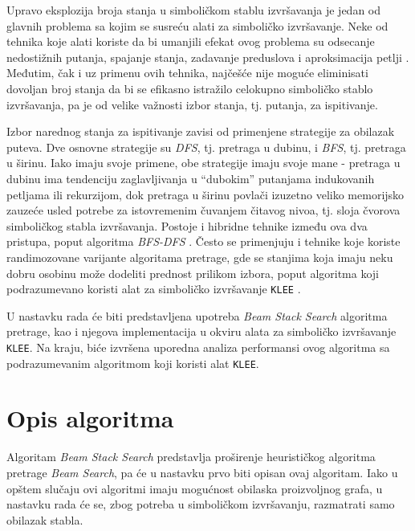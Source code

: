 \documentclass[a4paper]{article}
\begin{document}
Upravo eksplozija broja stanja u simboličkom stablu izvršavanja je jedan od glavnih problema sa kojim se susreću alati za simboličko izvršavanje. Neke od tehnika koje alati koriste da bi umanjili efekat ovog problema su odsecanje nedostižnih putanja, spajanje stanja, zadavanje preduslova i aproksimacija petlji \cite{SurveySymExec-CSUR18}. Međutim, čak i uz primenu ovih tehnika, najčešće nije moguće eliminisati dovoljan broj stanja da bi se efikasno istražilo celokupno simboličko stablo izvršavanja, pa je od velike važnosti izbor stanja, tj. putanja, za ispitivanje.

Izbor narednog stanja za ispitivanje zavisi od primenjene strategije za obilazak puteva. Dve osnovne strategije su \textit{DFS}, tj. pretraga u dubinu, i \textit{BFS}, tj. pretraga u širinu. Iako imaju svoje primene, obe strategije imaju svoje mane - pretraga u dubinu ima tendenciju zaglavljivanja u \enquote{dubokim} putanjama indukovanih petljama ili rekurzijom, dok pretraga u širinu povlači izuzetno veliko memorijsko zauzeće usled potrebe za istovremenim čuvanjem čitavog nivoa, tj. sloja čvorova simboličkog stabla izvršavanja. Postoje i hibridne tehnike između ova dva pristupa, poput algoritma \textit{BFS-DFS} \cite{BFS/DFS-StrahinjaStanojevic}. Često se primenjuju i tehnike koje koriste randimozovane varijante algoritama pretrage, gde se stanjima koja imaju neku dobru osobinu može dodeliti prednost prilikom izbora, poput algoritma koji podrazumevano koristi alat za simboličko izvršavanje \verb|KLEE| \cite{KLEE-paper-10.5555/1855741.1855756}.

U nastavku rada će biti predstavljena upotreba \textit{Beam Stack Search} algoritma pretrage, kao i njegova implementacija u okviru alata za simboličko izvršavanje \verb|KLEE|. Na kraju, biće izvršena uporedna analiza performansi ovog algoritma sa podrazumevanim algoritmom koji koristi alat \verb|KLEE|.

\section{Opis algoritma}

Algoritam \textit{Beam Stack Search} \cite{BeamStackSearch-10.5555/3037062.3037074} predstavlja proširenje heurističkog algoritma pretrage \textit{Beam Search}, pa će u nastavku prvo biti opisan ovaj algoritam. Iako u opštem slučaju ovi algoritmi imaju mogućnost obilaska proizvoljnog grafa, u nastavku rada će se, zbog potreba u simboličkom izvršavanju, razmatrati samo obilazak stabla.
\end{document}
